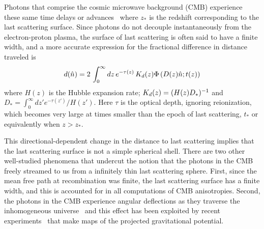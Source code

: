 \documentclass[prd,amsmath,amssymb,floatfix,superscriptaddress,nofootinbib,twocolumn]{revtex4-1}
\def\be{\begin{equation}}
\def\ee{\end{equation}}
\newcommand{\eql}[1]{\label{eq:#1}}
\newcommand{\wh}[1]{{\color{red} #1}}
\begin{document}
Photons that comprise the cosmic microwave background (CMB) experience these same time delays or advances~\cite{Hu:2001yq} where $z_*$ is the redshift corresponding to the last scattering surface. Since photons do not decouple instantaneously from the electron-proton plasma, the surface of last scattering is often said to have a finite width, and a more accurate expression for the fractional difference in distance traveled is
\be
\fd(\hat n) = 2\, \int_0^{\infty} dz \, e^{-\tau(z)}\, K_\fd(z)\Phi\left(D(z)\hat n; t(z)\right)
\eql{deffield}
\ee
where $H(z)$ is the Hubble expansion rate; $K_d(z) =  (H(z)D_*)^{-1}$ and $D_* =  \int_0^\infty dz' e^{-\tau(z') }/H(z')$.  Here 
 $\tau$ is the optical depth, ignoring reionization, which becomes very large at times smaller than the epoch of  last scattering, $t_*$ or equivalently when $z>z_*$.

This directional-dependent change in the distance to last scattering implies that the last scattering surface is not a simple spherical shell. There are two other well-studied phenomena that undercut the notion that the photons in the CMB freely streamed to us from a infinitely thin last scattering sphere. First, since the mean free path at recombination was finite, the last scattering surface has a finite width, and this is accounted for in all computations of CMB anisotropies. Second, the photons in the CMB experience angular deflections as they traverse the inhomogeneous universe~\cite{Hu:2001tn,Lewis:2006fu} and this effect has been exploited by recent experiments~\cite{Smith:2007rg,Ade:2013tyw,Story:2014hni,Sherwin:2016tyf,Aghanim:2018oex} that make maps of the projected gravitational potential.
\end{document}
